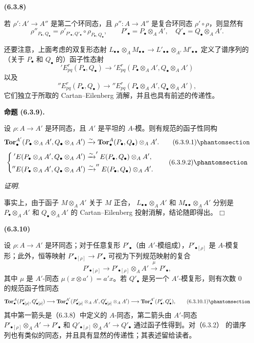 \documentclass[UTF8,fontset=none,11pt,oneside,openany]{ctexbook}
\providecommand{\square}{\mdlgwhtsquare}
\newenvironment{env}[1][]{%
  \par\medskip\noindent\textbf{(#1)}\ %
}{\par}
\newenvironment{proposition}[1][]{%
  \par\medskip\noindent\textbf{命题 (#1).}\ %
}{\par}
\newenvironment{proof}{%
  \par\smallskip\noindent\textit{证明.}\ %
}{\hfill$\square$\par}
\newcommand{\oldpage}[2][]{%
  \hypertarget{ega-source-page-#1-#2}{}%
  \marginnote{\scriptsize\textbf{#1}~|~#2}\ignorespaces}
\let\EGAOriginalLabel\label
\renewcommand{\label}[1]{\phantomsection\EGAOriginalLabel{#1}}
\begin{document}
\begin{env}[6.3.8]
若 $\rho':A'\to A''$ 是第二个环同态，且 $\rho'':A\to A''$ 是复合环同态
$\rho'\circ\rho$，则显然有
\[
  \rho''_{P_\bullet,Q_\bullet}
  =\rho'_{P'_\bullet,Q'_\bullet}\circ\rho_{P_\bullet,Q_\bullet},
  \qquad
  P'_\bullet=P_\bullet\otimes_A A',
  \quad Q'_\bullet=Q_\bullet\otimes_A A'.
\]

还要注意，上面考虑的双复形态射
$L_{\bullet\bullet}\otimes_A M_{\bullet\bullet}\to
L'_{\bullet\bullet}\otimes_{A'}M'_{\bullet\bullet}$ 定义了谱序列的（关于 $P_\bullet$ 和
$Q_\bullet$ 的）函子性态射
\[
  'E_{pq}^r(P_\bullet,Q_\bullet)
  \longrightarrow
  'E_{pq}^r(P_\bullet\otimes_A A',Q_\bullet\otimes_A A')
\]
以及
\[
  ''E_{pq}^r(P_\bullet,Q_\bullet)
  \longrightarrow
  ''E_{pq}^r(P_\bullet\otimes_A A',Q_\bullet\otimes_A A'),
\]
它们独立于所取的 Cartan--Eilenberg 消解，并且也具有前述的传递性。
\end{env}

\begin{proposition}[6.3.9]
设 $\rho:A\to A'$ 是环同态，且 $A'$ 是平坦的 $A$-模。则有规范的函子性同构
\[
  \mathbf{Tor}_\bullet^{A'}
  (P_\bullet\otimes_A A',Q_\bullet\otimes_A A')
  \xrightarrow{\sim}
  \mathbf{Tor}_\bullet^A(P_\bullet,Q_\bullet)\otimes_A A'.
  \tag{6.3.9.1}\label{III.6.3.9.1-fr}
\]
\[
  \left\{
  \begin{aligned}
  'E(P_\bullet\otimes_A A',Q_\bullet\otimes_A A')
    &\xrightarrow{\sim}'E(P_\bullet,Q_\bullet)\otimes_A A',\\
  ''E(P_\bullet\otimes_A A',Q_\bullet\otimes_A A')
    &\xrightarrow{\sim}''E(P_\bullet,Q_\bullet)\otimes_A A'.
  \end{aligned}
  \right.
  \tag{6.3.9.2}\label{III.6.3.9.2-fr}
\]
\end{proposition}

\begin{proof}
\oldpage[III]{145}
事实上，由于函子 $M\otimes_A A'$ 关于 $M$ 正合，
$L_{\bullet\bullet}\otimes_A A'$ 和 $M_{\bullet\bullet}\otimes_A A'$ 分别是
$P_\bullet\otimes_A A'$ 和 $Q_\bullet\otimes_A A'$ 的 Cartan--Eilenberg
投射消解，结论随即得出。
\end{proof}

\begin{env}[6.3.10]
设 $\rho:A\to A'$ 是环同态；对于任意复形
$P'_\bullet$（由 $A'$-模组成），$P'_{\bullet[\rho]}$ 是 $A$-模复形；此外，恒等映射
$P'_{\bullet[\rho]}\to P'_\bullet$ 可视为下列规范映射的复合
\[
  P'_{\bullet[\rho]}\longrightarrow
  P'_{\bullet[\rho]}\otimes_A A'
  \xrightarrow{\mu}P'_\bullet,
\]
其中 $\mu$ 是 $A'$-同态 $\mu(x\otimes a')=a'x$。若 $Q'_\bullet$
是另一个 $A'$-模复形，则有次数 0 的规范函子性同态
\[
  \mathbf{Tor}_\bullet^A(P'_{\bullet[\rho]},Q'_{\bullet[\rho]})
  \longrightarrow
  \mathbf{Tor}_\bullet^{A'}
  (P'_{\bullet[\rho]}\otimes_A A',Q'_{\bullet[\rho]}\otimes_A A')
  \longrightarrow
  \mathbf{Tor}_\bullet^{A'}(P'_\bullet,Q'_\bullet),
  \tag{6.3.10.1}\label{III.6.3.10.1-fr}
\]
其中第一箭头是（6.3.8）中定义的 $A$-同态，第二箭头由
$A'$-同态 $P'_{\bullet[\rho]}\otimes_A A'\to P'_\bullet$ 和
$Q'_{\bullet[\rho]}\otimes_A A'\to Q'_\bullet$ 通过函子性得到。对（6.3.2）
的谱序列也有类似的同态，并且具有显然的传递性；其表述留给读者。
\end{env}
\end{document}

